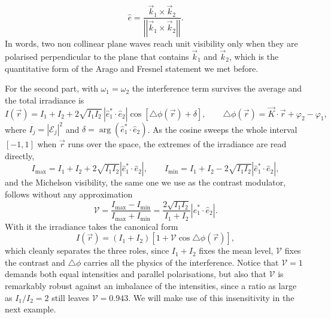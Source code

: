         \begin{equation}
            \hat{e} = \frac{\vec{k}_1\times\vec{k}_2}{\left|\left|\vec{k}_1\times\vec{k}_2\right|\right|}.
        \end{equation}
        In words, two non collinear plane waves reach unit visibility only when they are polarised perpendicular to the plane that contains $\vec{k}_1$ and $\vec{k}_2$, which is the quantitative form of the Arago and Fresnel statement we met before.

        For the second part, with $\omega_1 = \omega_2$ the interference term survives the average and the total irradiance is
        \begin{equation}
            I(\vec{r}) = I_1 + I_2 + 2\sqrt{I_1 I_2}\,\left|\hat{e}_1^*\cdot\hat{e}_2\right|\cos\left[\triangle\phi(\vec{r})+\delta\right], \qquad \triangle\phi(\vec{r}) = \vec{K}\cdot\vec{r} + \varphi_2 - \varphi_1,
        \end{equation}
        where $I_j = |\mathcal{E}_j|^2$ and $\delta = \arg(\hat{e}_1^*\cdot\hat{e}_2)$. As the cosine sweeps the whole interval $[-1,1]$ when $\vec{r}$ runs over the space, the extremes of the irradiance are read directly,
        \begin{equation}
            I_{\max} = I_1 + I_2 + 2\sqrt{I_1 I_2}\left|\hat{e}_1^*\cdot\hat{e}_2\right|, \qquad I_{\min} = I_1 + I_2 - 2\sqrt{I_1 I_2}\left|\hat{e}_1^*\cdot\hat{e}_2\right|,
        \end{equation}
        and the Michelson visibility, the same one we use as the contrast modulator, follows without any approximation
        \begin{equation}\label{eq:P1visibility}
            \mathcal{V} = \frac{I_{\max}-I_{\min}}{I_{\max}+I_{\min}} = \frac{2\sqrt{I_1 I_2}}{I_1 + I_2}\left|\hat{e}_1^*\cdot\hat{e}_2\right|.
        \end{equation}
        With it the irradiance takes the canonical form
        \begin{equation}\label{eq:P1canonical}
            I(\vec{r}) = (I_1 + I_2)\left[1 + \mathcal{V}\cos\triangle\phi(\vec{r})\right],
        \end{equation}
        which cleanly separates the three roles, since $I_1 + I_2$ fixes the mean level, $\mathcal{V}$ fixes the contrast and $\triangle\phi$ carries all the physics of the interference. Notice that $\mathcal{V} = 1$ demands both equal intensities and parallel polarisations, but also that $\mathcal{V}$ is remarkably robust against an imbalance of the intensities, since a ratio as large as $I_1/I_2 = 2$ still leaves $\mathcal{V} = 0.943$. We will make use of this insensitivity in the next example.

